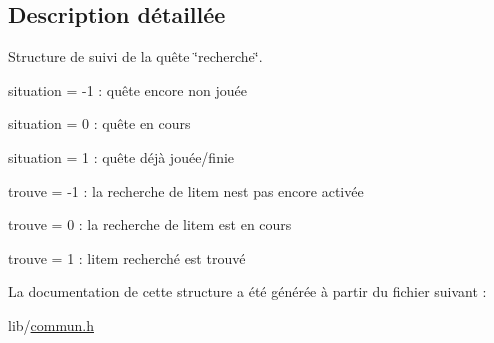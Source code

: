 \subsection{Description détaillée}
Structure de suivi de la quête \char`\"{}recherche\char`\"{}. 


\begin{DoxyItemize}
\item situation = -\/1 \+: quête encore non jouée
\item situation = 0 \+: quête en cours
\item situation = 1 \+: quête déjà jouée/finie
\item trouve = -\/1 \+: la recherche de l\textquotesingle{}item n\textquotesingle{}est pas encore activée
\item trouve = 0 \+: la recherche de l\textquotesingle{}item est en cours
\item trouve = 1 \+: l\textquotesingle{}item recherché est trouvé 
\end{DoxyItemize}

La documentation de cette structure a été générée à partir du fichier suivant \+:\begin{DoxyCompactItemize}
\item 
lib/\hyperlink{commun_8h}{commun.\+h}\end{DoxyCompactItemize}
